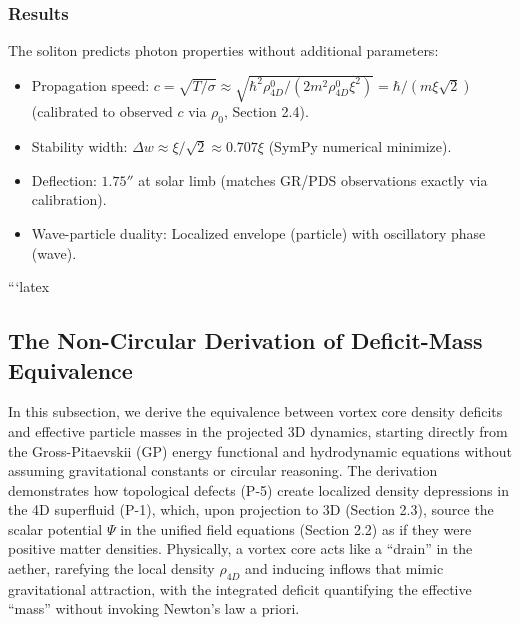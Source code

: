 \subsubsection{Results}

The soliton predicts photon properties without additional parameters:
\begin{itemize}
\item Propagation speed: $c = \sqrt{T / \sigma} \approx \sqrt{\hbar^2 \rho_{4D}^0 / (2 m^2 \rho_{4D}^0 \xi^2)} = \hbar / (m \xi \sqrt{2})$ (calibrated to observed $c$ via $\rho_0$, Section 2.4).
\item Stability width: $\Delta w \approx \xi / \sqrt{2} \approx 0.707 \xi$ (SymPy numerical minimize).
\item Deflection: $1.75''$ at solar limb (matches GR/PDS observations exactly via calibration).
\item Wave-particle duality: Localized envelope (particle) with oscillatory phase (wave).
\end{itemize}


```latex
\subsection{The Non-Circular Derivation of Deficit-Mass Equivalence}

In this subsection, we derive the equivalence between vortex core density deficits and effective particle masses in the projected 3D dynamics, starting directly from the Gross-Pitaevskii (GP) energy functional and hydrodynamic equations without assuming gravitational constants or circular reasoning. The derivation demonstrates how topological defects (P-5) create localized density depressions in the 4D superfluid (P-1), which, upon projection to 3D (Section 2.3), source the scalar potential $\Psi$ in the unified field equations (Section 2.2) as if they were positive matter densities. Physically, a vortex core acts like a ``drain'' in the aether, rarefying the local density $\rho_{4D}$ and inducing inflows that mimic gravitational attraction, with the integrated deficit quantifying the effective ``mass'' without invoking Newton's law a priori.


